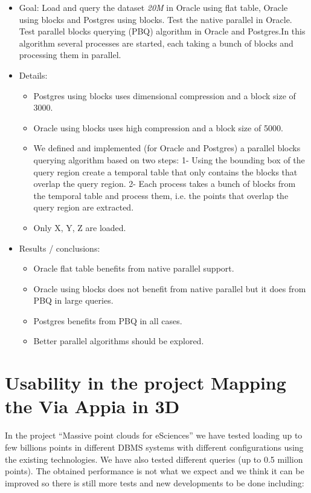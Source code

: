 \documentclass[a4paper,11pt]{article}
\begin{document}
\begin{itemize}
	\item Goal: Load and query the dataset \textit{20M} in Oracle using flat table, Oracle using blocks and Postgres using blocks. Test the native parallel in Oracle. Test parallel blocks querying (PBQ) algorithm in Oracle and Postgres.In this algorithm several processes are started, each taking a bunch of blocks and processing them in parallel.
	\item Details: 
	\begin{itemize}
		\item Postgres using blocks uses dimensional compression and a block size of 3000.
		\item Oracle using blocks uses high compression and a block size of 5000.
		\item We defined and implemented (for Oracle and Postgres) a parallel blocks querying algorithm based on two steps: 1- Using the bounding box of the query region create a temporal table that only contains the blocks that overlap the query region. 2- Each process takes a bunch of blocks from the temporal table and process them, i.e. the points that overlap the query region are extracted.
		\item Only X, Y, Z are loaded.
	\end{itemize}				
	\item Results / conclusions: 
	\begin{itemize}
		\item Oracle flat table benefits from native parallel support.
		\item Oracle using blocks does not benefit from native parallel but it does from PBQ in large queries. 
		\item Postgres benefits from PBQ in all cases.
		\item Better parallel algorithms should be explored.
	\end{itemize}			
\end{itemize}

\section{Usability in the project Mapping the Via Appia in 3D}

In the project ``Massive point clouds for eSciences'' we have tested loading up to few billions points in different DBMS systems with different configurations using the existing technologies. We have also tested different queries (up to 0.5 million points). The obtained performance is not what we expect and we think it can be improved so there is still more tests and new developments to be done including:
\end{document}
